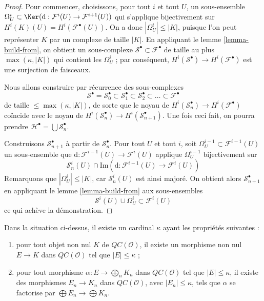 \begin{proof}
Pour commencer, choisissons, pour tout $i$ et tout $U$, un sous-ensemble
$\Omega^i_U \subset \Ker(\text{d} :
\mathcal{F}^i(U) \to \mathcal{F}^{i + 1}(U))$
qui s'applique bijectivement sur
$H^i(K)(U) = H^i(\mathcal{F}^\bullet(U))$.
On a donc $|\Omega^i_U| \leq |K|$, puisque l'on peut représenter $K$ par un
complexe de taille $|K|$. En appliquant le lemme \ref{lemma-build-from}, on
obtient un sous-complexe
$\mathcal{S}^\bullet \subset \mathcal{F}^\bullet$ de taille au plus
$\max(\kappa, |K|)$ qui contient les $\Omega^i_U$ ; par conséquent,
$H^i(\mathcal{S}^\bullet) \to H^i(\mathcal{F}^\bullet)$ est une surjection de
faisceaux.

\medskip\noindent
Nous allons construire par récurrence des sous-complexes
$$
\mathcal{S}^\bullet =
\mathcal{S}_0^\bullet \subset
\mathcal{S}_1^\bullet \subset
\mathcal{S}_2^\bullet \subset \ldots \subset \mathcal{F}^\bullet
$$
de taille $\leq \max(\kappa, |K|)$, de sorte que le noyau de
$H^i(\mathcal{S}_n^\bullet) \to H^i(\mathcal{F}^\bullet)$ coïncide avec le
noyau de
$H^i(\mathcal{S}_n^\bullet) \to H^i(\mathcal{S}_{n + 1}^\bullet)$.
Une fois ceci fait, on pourra prendre
$\mathcal{H}^\bullet = \bigcup \mathcal{S}_n^\bullet$.

\medskip\noindent
Construisons $\mathcal{S}_{n + 1}^\bullet$ à partir de
$\mathcal{S}_n^\bullet$. Pour tout $U$ et tout $i$, soit
$\Omega^{i - 1}_U \subset \mathcal{F}^{i - 1}(U)$ un sous-ensemble que
$\text{d} : \mathcal{F}^{i - 1}(U) \to \mathcal{F}^i(U)$ applique
$\Omega^{i - 1}_U$ bijectivement sur
$$
\mathcal{S}_n^i(U) \cap
\text{Im}(\text{d} : \mathcal{F}^{i - 1}(U)\to \mathcal{F}^i(U))
$$
Remarquons que $|\Omega^i_U| \leq |K|$, car
$\mathcal{S}_n^i(U)$ est ainsi majoré. On obtient alors
$\mathcal{S}_{n + 1}^\bullet$ en appliquant le lemme
\ref{lemma-build-from} aux sous-ensembles
$$
\mathcal{S}^i(U) \cup \Omega^i_U \subset \mathcal{F}^i(U)
$$
ce qui achève la démonstration.
\end{proof}

\begin{lemma}
\label{lemma-cartesian-colimit-kappa}
Dans la situation ci-dessus, il existe un cardinal $\kappa$ ayant les
propriétés suivantes :
\begin{enumerate}
\item pour tout objet non nul $K$ de $\mathit{QC}(\mathcal{O})$, il existe un
morphisme non nul $E \to K$ dans $\mathit{QC}(\mathcal{O})$ tel que
$|E| \leq \kappa$ ;
\item pour tout morphisme $\alpha : E \to \bigoplus_n K_n$ dans
$\mathit{QC}(\mathcal{O})$ tel que $|E| \leq \kappa$, il existe des
morphismes $E_n \to K_n$ dans $\mathit{QC}(\mathcal{O})$, avec
$|E_n| \leq \kappa$, tels que $\alpha$ se factorise par
$\bigoplus E_n \to \bigoplus K_n$.
\end{enumerate}
\end{lemma}

